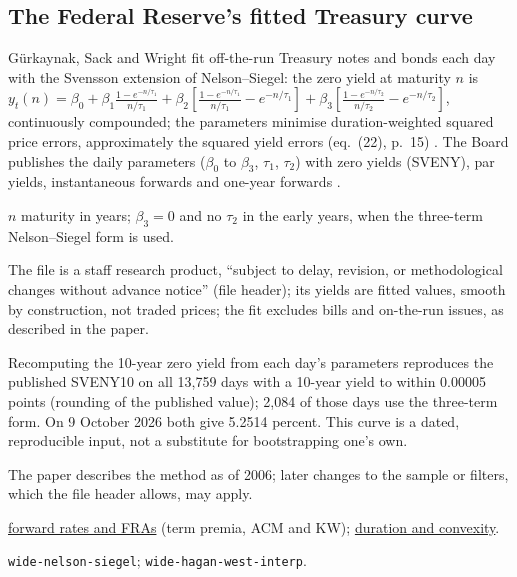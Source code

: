 \subsection{The Federal Reserve's fitted Treasury curve}

\begin{qfdata}\label{data:gsw-treasury-curve}
 Gürkaynak, Sack and Wright fit off-the-run Treasury notes and bonds each day with the Svensson extension of Nelson--Siegel: the zero yield at maturity $n$ is $y_t(n)=\beta_0+\beta_1\frac{1-e^{-n/\tau_1}}{n/\tau_1}+\beta_2[\frac{1-e^{-n/\tau_1}}{n/\tau_1}-e^{-n/\tau_1}]+\beta_3[\frac{1-e^{-n/\tau_2}}{n/\tau_2}-e^{-n/\tau_2}]$, continuously compounded; the parameters minimise duration-weighted squared price errors, approximately the squared yield errors (eq.~(22), p.~15) \citep[FEDS 2006-28, sec.~3, pp.~13--15]{wide-gsw-yield-curve}. The Board publishes the daily parameters ($\beta_0$ to $\beta_3$, $\tau_1$, $\tau_2$) with zero yields (SVENY), par yields, instantaneous forwards and one-year forwards \citep[file \texttt{feds200628.csv}, 14 June 1961 to 9 October 2026]{fed-gsw-data}.

 $n$ maturity in years; $\beta_3=0$ and no $\tau_2$ in the early years, when the three-term Nelson--Siegel form is used.

 The file is a staff research product, ``subject to delay, revision, or methodological changes without advance notice'' (file header); its yields are fitted values, smooth by construction, not traded prices; the fit excludes bills and on-the-run issues, as described in the paper.

 Recomputing the 10-year zero yield from each day's parameters reproduces the published SVENY10 on all 13{,}759 days with a 10-year yield to within 0.00005 points (rounding of the published value); 2{,}084 of those days use the three-term form. On 9 October 2026 both give 5.2514 percent. This curve is a dated, reproducible input, not a substitute for bootstrapping one's own.

 The paper describes the method as of 2006; later changes to the sample or filters, which the file header allows, may apply.

 \hyperref[mod:forward-rates-fra]{forward rates and FRAs} (term premia, ACM and KW); \hyperref[mod:duration-convexity]{duration and convexity}.

 \nolinkurl{wide-nelson-siegel}; \nolinkurl{wide-hagan-west-interp}.

\end{qfdata}
